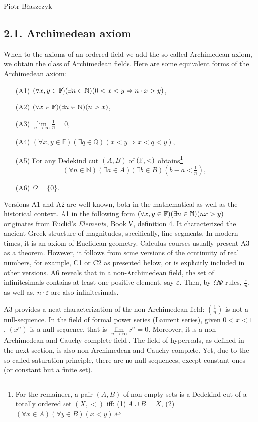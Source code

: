 \begin{artengenv}{Piotr Błaszczyk}
\subsection{2.1. Archimedean axiom}
When to the axioms of an ordered field we add the so-called Archimedean axiom, we obtain the class of
Archimedean fields.
Here are some equivalent forms of the Archimedean axiom:
\begin{enumerate}\itemsep 0mm
  \item [(A1)] $(\forall x,y\in {\mathbb{F}})(\exists n\in{\mathbb{N}})(0<x<y\Rightarrow n\cdot x>y)$,
  \item [(A2)] $(\forall x\in\mathbb F)(\exists n\in{\mathbb{N}})(n>x) $,
  \item [(A3)] $\lim\limits_{n\to \infty} \frac 1n=0$,
  \item [(A4)] $(\forall x,y\in\mathbb F)(\exists q\in\mathbb Q)( x<y\Rightarrow x<q<y),$
\item [(A5)] For any Dedekind cut  $(A,B)$ of $({\mathbb{F}},<)$ obtains\footnote{For the remainder, a pair $(A,B)$
 of non-empty sets is a Dedekind cut of a totally ordered set $(X,<)$ iff: (1) $A\cup B=X$, %
 (2) $(\forall x\in A)(\forall y\in B)(x<y)$.}
$$(\forall n\in\mathbb{N})(\exists a\in A)(\exists b\in B)(b-a<\tfrac 1n),$$
\item[(A6)] $\Omega=\{0\}$.
\end{enumerate}



Versions A1 and A2 are well-known,  both in the mathematical as well as the historical context. A1 in the following form $(\forall x,y\in {\mathbb{F}})(\exists n\in{\mathbb{N}})(nx>y)$ originates from Euclid's \textit{Elements}, Book V, definition 4. It characterized the ancient Greek structure of magnitudes, specifically, line segments. In modern times, it is an axiom of Euclidean geometry.  Calculus courses usually present A3 as a theorem. However, it  follows from some versions of the continuity of real numbers, for example, C1 or C2 as presented below, 
or is explicitly included in other versions.
  A6 reveals that in a non-Archimedean field, the set of infinitesimals contains at least one positive element, say $\varepsilon$.
     Then, by $\Omega\Psi$ rules, $\tfrac \varepsilon n$, as well as, $n\cdot\varepsilon$   are also infinitesimals.

A3 provides a neat characterization of the non-Archimedean field: $(\frac 1n)$ is not a null-sequence.
In the field of formal power series (Laurent series), given $0<x<1$, $(x^n)$ is a null-sequence, that is \mbox{$\lim\limits_{n\to \infty}x^n=0$}. Moreover, it is a non-Archimedean and Cauchy-complete field \parencites[see][70]{ref_ce}[or][269--272]{ref_pb07}. The field of hyperreals, as defined in the next section, is also non-Archimedean and Cauchy-complete. Yet, due to the so-called saturation principle, there are no null sequences, except constant ones (or constant but a finite set).  


\end{artengenv}
